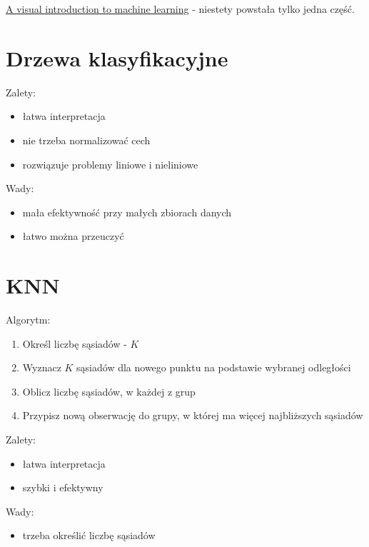 \documentclass[]{book}
\providecommand{\tightlist}{%
  \setlength{\itemsep}{0pt}\setlength{\parskip}{0pt}}
\begin{document}
\href{http://www.r2d3.us/visual-intro-to-machine-learning-part-1/}{A
visual introduction to machine learning} - niestety powstała tylko jedna
część.

\section{Drzewa klasyfikacyjne}\label{drzewa-klasyfikacyjne}

Zalety:

\begin{itemize}
\tightlist
\item
  łatwa interpretacja
\item
  nie trzeba normalizować cech
\item
  rozwiązuje problemy liniowe i nieliniowe
\end{itemize}

Wady:

\begin{itemize}
\tightlist
\item
  mała efektywność przy małych zbiorach danych
\item
  łatwo można przeuczyć
\end{itemize}

\section{KNN}\label{knn}

Algorytm:

\begin{enumerate}
\def\labelenumi{\arabic{enumi}.}
\tightlist
\item
  Określ liczbę sąsiadów - \(K\)
\item
  Wyznacz \(K\) sąsiadów dla nowego punktu na podstawie wybranej
  odległości
\item
  Oblicz liczbę sąsiadów, w każdej z grup
\item
  Przypisz nową obserwację do grupy, w której ma więcej najbliższych
  sąsiadów
\end{enumerate}

Zalety:

\begin{itemize}
\tightlist
\item
  łatwa interpretacja
\item
  szybki i efektywny
\end{itemize}

Wady:

\begin{itemize}
\tightlist
\item
  trzeba określić liczbę sąsiadów
\end{itemize}
\end{document}
